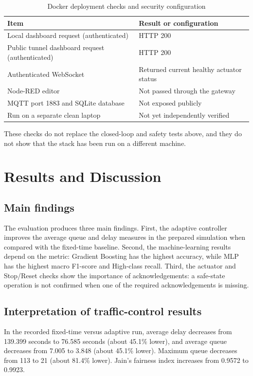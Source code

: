 \documentclass[12pt,a4paper,oneside]{report}
\begin{document}
\begin{table}[htbp]\centering\small
\caption{Docker deployment checks and security configuration}\label{tab:docker-checks}
\begin{tabular}{|p{}|p{}|}\hline
\textbf{Item} & \textbf{Result or configuration} \\\hline
Local dashboard request (authenticated) & HTTP 200 \\\hline
Public tunnel dashboard request (authenticated) & HTTP 200 \\\hline
Authenticated WebSocket & Returned current healthy actuator status \\\hline
Node-RED editor & Not passed through the gateway \\\hline
MQTT port 1883 and SQLite database & Not exposed publicly \\\hline
Run on a separate clean laptop & Not yet independently verified \\\hline
\end{tabular}\end{table}

These checks do not replace the closed-loop and safety tests above, and they do not show that the stack has been run on a different machine.

\clearpage
\chapter{Results and Discussion}
\section{Main findings}
The evaluation produces three main findings. First, the adaptive controller improves the average queue and delay measures in the prepared simulation when compared with the fixed-time baseline. Second, the machine-learning results depend on the metric: Gradient Boosting has the highest accuracy, while MLP has the highest macro F1-score and High-class recall. Third, the actuator and Stop/Reset checks show the importance of acknowledgements: a safe-state operation is not confirmed when one of the required acknowledgements is missing.

\section{Interpretation of traffic-control results}
In the recorded fixed-time versus adaptive run, average delay decreases from 139.399 seconds to 76.585 seconds (about 45.1\% lower), and average queue decreases from 7.005 to 3.848 (about 45.1\% lower). Maximum queue decreases from 113 to 21 (about 81.4\% lower). Jain's fairness index increases from 0.9572 to 0.9923.
\end{document}
